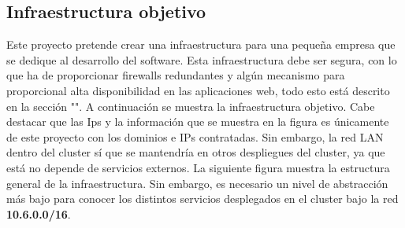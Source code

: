\subsection{Infraestructura objetivo}
\label{infraestructura_objetivo}
\begin{text}
	Este proyecto pretende crear una infraestructura para una pequeña empresa que se dedique al desarrollo del software. Esta infraestructura debe ser segura, con lo que ha de proporcionar firewalls redundantes y algún mecanismo para proporcional alta disponibilidad en las aplicaciones web, todo esto está descrito en la sección "".  A continuación se muestra la infraestructura objetivo. Cabe destacar que las Ips y la información que se muestra en la figura es únicamente de este proyecto con los dominios e IPs contratadas. Sin embargo, la red LAN dentro del cluster sí que se mantendría en otros despliegues del cluster, ya que está no depende de servicios externos. La siguiente figura muestra la estructura general de la infraestructura. Sin embargo, es necesario un nivel de abstracción más bajo para conocer los distintos servicios desplegados en el cluster bajo la red \textbf{10.6.0.0/16}.
	
	\clearpage
	

\end{text}
